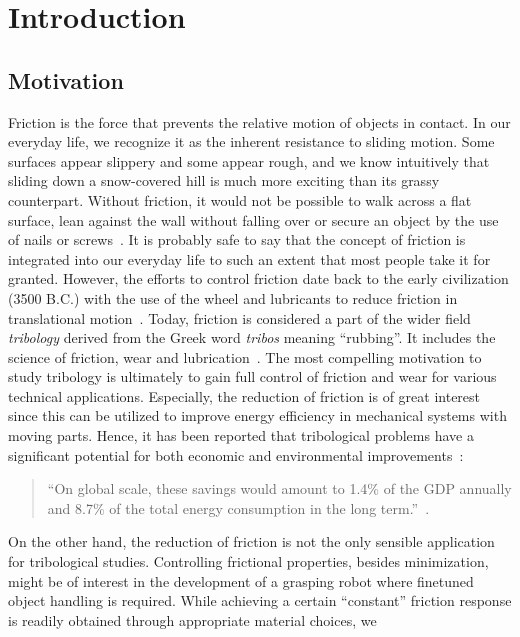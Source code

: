 \chapter{Introduction}

\section{Motivation}
Friction is the force that prevents the relative motion of objects in contact.
In our everyday life, we recognize it as the inherent resistance to sliding
motion. Some surfaces appear slippery and some appear rough, and we know intuitively
that sliding down a snow-covered hill is much more exciting than its grassy
counterpart. Without friction, it would not be possible to walk across a flat
surface, lean against the wall without falling over or secure an object by the
use of nails or screws~\cite[p. 5]{gnecco_meyer_2015}. It is probably safe to
say that the concept of friction is integrated into our everyday life to such an
extent that most people take it for granted. However, the efforts to control
friction date back to the early civilization (3500 B.C.) with the use of the
wheel and lubricants to reduce friction in translational
motion~\cite{bhushan_2013}. Today, friction is considered a part of the wider
field \textit{tribology} derived from the Greek word \textit{tribos} meaning
``rubbing''. It includes the science of friction, wear and
lubrication~\cite{bhushan_2013}. The most compelling motivation to study
tribology is ultimately to gain full control of friction and wear for various
technical applications. Especially, the reduction of friction is of great interest since this can be utilized to improve energy efficiency in mechanical systems with moving parts. Hence, it has been reported that
tribological problems have a significant potential for both economic and
environmental improvements~\cite{kim_nano-scale_2009}:
\begin{quote}
    ``On global scale, these savings would amount to 1.4\% of the GDP annually
    and 8.7\% of the total energy consumption in the long
    term.''~\cite{holmberg_influence_2017}. 
\end{quote}
On the other hand, the reduction of friction is not the only sensible
application for tribological studies. Controlling frictional properties, besides
minimization, might be of interest in the development of a grasping robot where
finetuned object handling is required. While achieving a certain ``constant''
friction response is readily obtained through appropriate material choices, we
